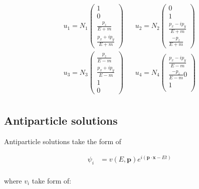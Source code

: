 \documentclass[10pt]{article}
\theoremstyle{definition}
\begin{document}
\begin{align*}
    u_1 = N_1\begin{pmatrix}
        1\\
        0\\
        \frac{p_z}{E+m}\\
        \frac{p_x+ip_y}{E+m}
    \end{pmatrix}
    \;\;\; &
    u_2 = N_2\begin{pmatrix}
        0\\
        1\\
        \frac{p_x-ip_y}{E+m}\\
        \frac{-p_z}{E+m}
    \end{pmatrix}\\
    u_3 = N_3\begin{pmatrix}
        \frac{p_z}{E-m}\\
        \frac{p_x+ip_y}{E-m}\\
        1\\
        0
    \end{pmatrix}
    \;\;\; &
    u_4 = N_4\begin{pmatrix}
        \frac{p_x-ip_y}{E-m}\\
        \frac{-p_z}{E-m}
        0\\
        1\\
    \end{pmatrix}\\
\end{align*}

\subsection*{Antiparticle solutions}%

Antiparticle solutions take the form of

\begin{align}
    \psi_i &= v(E,\mathbf{p})e^{i(\mathbf{p}\cdot\mathbf{x}-Et)}\\
\end{align}

where $v_i$ take form of:
\end{document}
